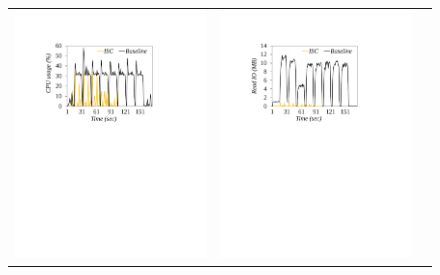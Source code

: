 \begin{figure}[t]
  \centering
  \renewcommand{\tabcolsep}{1mm}
  \begin{tabular}{ccc}
 \includegraphics[width=0.66\columnwidth]{figures/Hadoop_CPU_usage.pdf}&
  \includegraphics[width=0.66\columnwidth]{figures/Hadoop_read_io.pdf}&

\end{tabular}
\end{figure}
